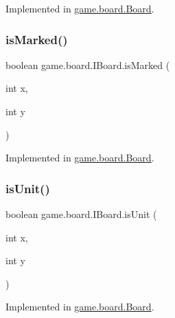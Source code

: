 Implemented in \mbox{\hyperlink{classgame_1_1board_1_1_board_aed2c46e80ddb40b36cbd09bb42b43974}{game.\+board.\+Board}}.

\mbox{\label{interfacegame_1_1board_1_1_i_board_ae5dd67cb593fd6609401b115faa4c42e}} 
\subsubsection{\texorpdfstring{is\+Marked()}{isMarked()}}
{\footnotesize\ttfamily boolean game.\+board.\+I\+Board.\+is\+Marked (\begin{DoxyParamCaption}\item[{int}]{x,  }\item[{int}]{y }\end{DoxyParamCaption})}



Implemented in \mbox{\hyperlink{classgame_1_1board_1_1_board_af3a3c94fbe601ba799bfe105e0630be6}{game.\+board.\+Board}}.

\mbox{\label{interfacegame_1_1board_1_1_i_board_aeb50b7b22128aaddcbea6330ba78a03e}} 
\subsubsection{\texorpdfstring{is\+Unit()}{isUnit()}}
{\footnotesize\ttfamily boolean game.\+board.\+I\+Board.\+is\+Unit (\begin{DoxyParamCaption}\item[{int}]{x,  }\item[{int}]{y }\end{DoxyParamCaption})}



Implemented in \mbox{\hyperlink{classgame_1_1board_1_1_board_aed65bda6e81b3ddbc14fa80bd52ac992}{game.\+board.\+Board}}.

\mbox{\label{interfacegame_1_1board_1_1_i_board_ad6794d47ba9f6c10be5fd956c786f0b5}} 
